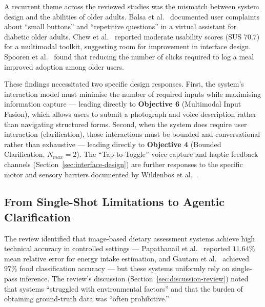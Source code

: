 A recurrent theme across the reviewed studies was the mismatch between system design and the abilities of older adults. Balsa et al.\ \citep{balsaUsabilityIntelligentVirtual2020} documented user complaints about ``small buttons'' and ``repetitive questions'' in a virtual assistant for diabetic older adults. Chew et al.\ \citep{chewADLDigitalToolkit2025} reported moderate usability scores (SUS 70.7) for a multimodal toolkit, suggesting room for improvement in interface design. Spooren et al.\ \citep{spoorenImprovingRecommendationsMeals2023} found that reducing the number of clicks required to log a meal improved adoption among older users.

These findings necessitated two specific design responses. First, the system's interaction model must minimise the number of required inputs while maximising information capture --- leading directly to \textbf{Objective 6} (Multimodal Input Fusion), which allows users to submit a photograph and voice description rather than navigating structured forms. Second, when the system does require user interaction (clarification), those interactions must be bounded and conversational rather than exhaustive --- leading directly to \textbf{Objective 4} (Bounded Clarification, $N_{max}=2$). The ``Tap-to-Toggle'' voice capture and haptic feedback channels (Section~\ref{sec:interface-design}) are further responses to the specific motor and sensory barriers documented by Wildenbos et al.\ \citep{wildenbosAgingBarriersInfluencing2018}.

\subsection{From Single-Shot Limitations to Agentic Clarification}

The review identified that image-based dietary assessment systems achieve high technical accuracy in controlled settings --- Papathanail et al.\ \citep{papathanailEvaluationNovelArtificial2021} reported $11.64\%$ mean relative error for energy intake estimation, and Gautam et al.\ \citep{gautamFoodAssessmentModel2022} achieved $97\%$ food classification accuracy --- but these systems uniformly rely on single-pass inference. The review's discussion (Section~\ref{sec:discussion-review}) noted that systems ``struggled with environmental factors'' and that the burden of obtaining ground-truth data was ``often prohibitive.''


